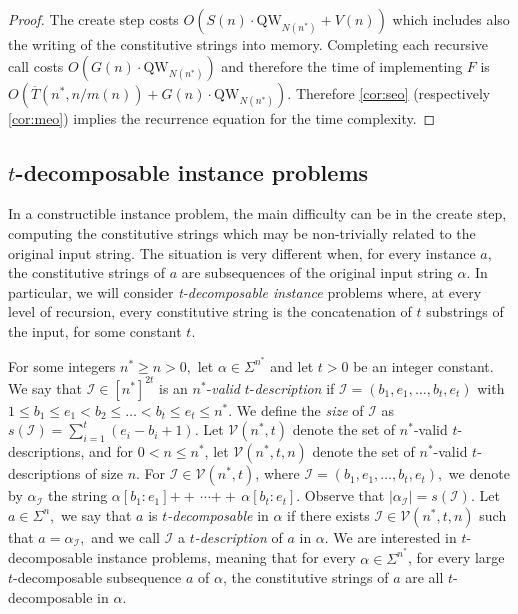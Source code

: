 \documentclass[12pt]{article}
\newcommand{\qw}{\mathrm{QW}}
\newcommand{\concat}{\ensuremath{+\!\!\!\!+\,}}
\theoremstyle{definition}
\begin{document}
\begin{proof}
The create step costs ${O} \left( S(n)\cdot\qw_{N(n^*)} + V(n) \right)$ which includes also the writing of the constitutive strings into memory.
Completing each recursive call costs  $O(G(n) \cdot \qw_{N(n^*)})$ and therefore the time of implementing $F$ is $O(\overline{T}(n^*, n/m(n)) + G(n) \cdot \qw_{N(n^*)})$. 
Therefore \cref{cor:seo} (respectively \cref{cor:meo}) implies the recurrence equation for the time complexity.
\end{proof}

\subsection{$t$-decomposable instance problems} 
\label{subsec:self-reducible}

In a constructible instance problem, the main difficulty can be in the create step, computing the constitutive strings which may be non-trivially related to the original input string. The situation is very different when, for every instance $a$, the constitutive strings of $a$ are subsequences of the original input string $\alpha$. In particular, we will consider \emph{t-decomposable instance} problems where, at every level of recursion, every constitutive string is the concatenation of $t$ substrings of the input, for some constant $t$.


For some integers ${n^*} \geq n > 0,$ let $\alpha \in \Sigma^{n^*}$ and let $t > 0$ be an integer constant.
We say that $\mathcal{I} \in [n^*]^{2t}$ is an $n^*$-{\em valid} $t$-{\em description}  if $\mathcal{I} = (b_1, e_1, \ldots, b_t, e_t)$ with $1\leq b_1 \leq e_1 < b_2 \leq  \ldots  < b_t \leq e_t \leq {n^*}$.
We define the {\em size} of $\mathcal{I}$ as $s(\mathcal{I}) = \sum_{i=1}^t (e_i - b_i +1)$.
Let $\mathcal{V}(n^*,t)$ denote the set of $n^*$-{valid} $t$-descriptions, and for $0 < n \leq n^*$, let $\mathcal{V}(n^*,t,n)$ denote the set of $n^*$-{valid} $t$-descriptions of size $n$.
For $\mathcal{I} \in  \mathcal{V}(n^*,t)$, where $\mathcal{I} = (b_1, e_1, \ldots, b_t, e_t),$ we denote by $\alpha_{\mathcal{I}}$ the string $\alpha[b_1:e_1]\concat \cdots \concat \alpha[b_t:e_t]$.
Observe that $|\alpha_{\mathcal{I}}| = s(\mathcal{I}).$
Let $a \in \Sigma^n,$ we say that $a$ is {\em $t$-decomposable} in $\alpha$ if there exists $\mathcal{I} \in  \mathcal{V}(n^*,t, n)$ such that $a = \alpha_{\mathcal{I}},$ and we call $\mathcal{I}$ a {\em $t$-description} of $a$ in $\alpha$. 
We are interested in $t$-decomposable instance problems, meaning that for every $\alpha \in \Sigma^{n^*}$, for every large $t$-decomposable subsequence $a$ of $\alpha$, the constitutive strings of $a$ are all $t$-decomposable in $\alpha$.
\end{document}
